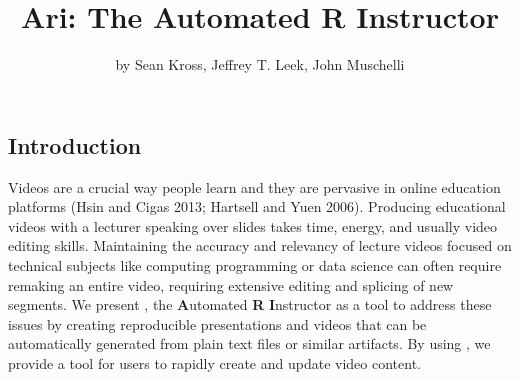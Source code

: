 \title{Ari: The Automated R Instructor}
\author{by Sean Kross, Jeffrey T. Leek, John Muschelli}

\maketitle



\hypertarget{introduction}{%
\subsection{Introduction}\label{introduction}}

Videos are a crucial way people learn and they are pervasive in online
education platforms (Hsin and Cigas 2013; Hartsell and Yuen 2006).
Producing educational videos with a lecturer speaking over slides takes
time, energy, and usually video editing skills. Maintaining the accuracy
and relevancy of lecture videos focused on technical subjects like
computing programming or data science can often require remaking an
entire video, requiring extensive editing and splicing of new segments.
We present , the \textbf{A}utomated \textbf{R}
\textbf{I}nstructor as a tool to address these issues by creating
reproducible presentations and videos that can be automatically
generated from plain text files or similar artifacts. By using
, we provide a tool for users to rapidly create and update
video content.

